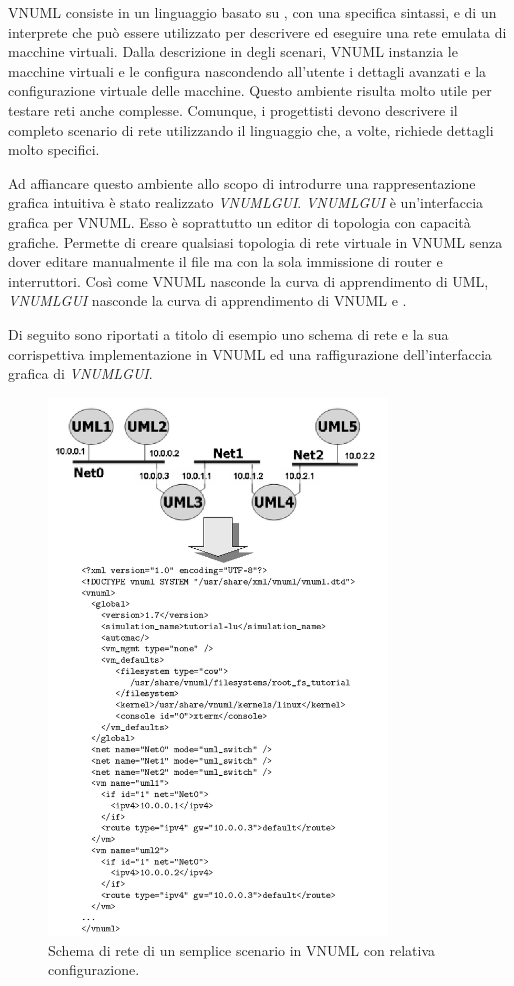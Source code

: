 VNUML consiste in un linguaggio basato su \xml{}, con una specifica sintassi, e di un interprete che può essere utilizzato per descrivere ed eseguire una rete emulata di macchine virtuali.
Dalla descrizione in \xml{} degli scenari, VNUML instanzia le macchine virtuali e le configura nascondendo all'utente i dettagli avanzati e la configurazione virtuale delle macchine. Questo ambiente risulta molto utile per testare reti anche complesse. Comunque, i progettisti devono descrivere il completo scenario di rete utilizzando il linguaggio \xml{} che, a volte, richiede dettagli molto specifici.

Ad affiancare questo ambiente allo scopo di introdurre una rappresentazione grafica intuitiva è stato realizzato \emph{VNUMLGUI}\cite{VNUMLGUI}. \emph{VNUMLGUI} è un'interfaccia grafica per VNUML.
Esso è soprattutto un editor di topologia con capacità grafiche. Permette di creare qualsiasi topologia di rete virtuale in VNUML senza dover editare manualmente il file \xml{} ma con la sola immissione di router e interruttori.
Così come VNUML nasconde la curva di apprendimento di UML, \emph{VNUMLGUI} nasconde la curva di apprendimento di VNUML e \xml{}.

Di seguito sono riportati a titolo di esempio uno schema di rete e la sua corrispettiva implementazione in VNUML ed una raffigurazione dell'interfaccia grafica di \emph{VNUMLGUI}.

\begin{figure}[!ht]
	\centering
	\includegraphics[width=9cm]{images/vnuml_01.png}
	\caption{Schema di rete di un semplice scenario in VNUML con relativa configurazione.}
	\label{figura:vnuml_gui}
\end{figure}

